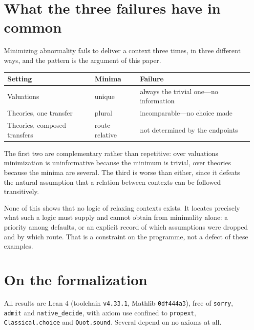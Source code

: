 \documentclass[11pt]{article}
\theoremstyle{plain}
\theoremstyle{remark}
\begin{document}
\section{What the three failures have in common}

Minimizing abnormality fails to deliver a context three times, in three
different ways, and the pattern is the argument of this paper.

\begin{center}
\begin{tabular}{@{}lll@{}}
\toprule
Setting & Minima & Failure \\
\midrule
Valuations & unique & always the trivial one---no information \\
Theories, one transfer & plural & incomparable---no choice made \\
Theories, composed transfers & route-relative & not determined by the endpoints \\
\bottomrule
\end{tabular}
\end{center}

\medskip

The first two are complementary rather than repetitive: over valuations
minimization is uninformative because the minimum is trivial, over theories
because the minima are several. The third is worse than either, since it defeats
the natural assumption that a relation between contexts can be followed
transitively.

None of this shows that no logic of relaxing contexts exists. It locates
precisely what such a logic must supply and cannot obtain from minimality alone:
a priority among defaults, or an explicit record of which assumptions were
dropped and by which route. That is a constraint on the programme, not a defect
of these examples.

\section{On the formalization}\label{sec:formalization}

All results are Lean 4 (toolchain \texttt{v4.33.1}, Mathlib \texttt{0df444a3}),
free of \texttt{sorry}, \texttt{admit} and \texttt{native\_decide}, with axiom
use confined to \texttt{propext}, \texttt{Classical.choice} and
\texttt{Quot.sound}. Several depend on no axioms at all.
\end{document}
